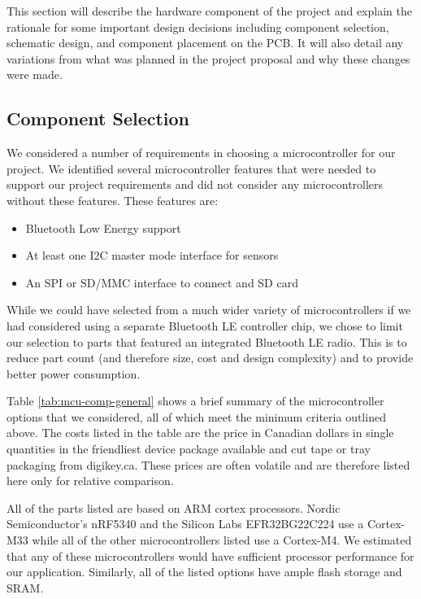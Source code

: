 This section will describe the hardware component of the project and explain 
the rationale for some important design decisions including component selection,
schematic design, and component placement on the PCB. It will also detail any 
variations from what was planned in the project proposal and why these changes
were made.

\subsection{Component Selection}

We considered a number of requirements in choosing a microcontroller for our
project. We identified several microcontroller features that were needed to
support our project requirements and did not consider any microcontrollers
without these features. These features are:
\begin{itemize}
    \item Bluetooth Low Energy support
    \item At least one I2C master mode interface for sensors
    \item An SPI or SD/MMC interface to connect and SD card
\end{itemize}

While we could have selected from a much wider variety of microcontrollers if we
had considered using a separate Bluetooth LE controller chip, we chose to limit
our selection to parts that featured an integrated Bluetooth LE radio. This is
to reduce part count (and therefore size, cost and design complexity) and to
provide better power consumption.

Table \ref{tab:mcu-comp-general} shows a brief summary of the microcontroller
options that we considered, all of which meet the minimum criteria outlined
above. The costs listed in the table are the price in Canadian dollars in single
quantities in the friendliest device package available and cut tape or tray
packaging from digikey.ca. These prices are often volatile and are therefore
listed here only for relative comparison.

All of the parts listed are based on ARM cortex processors. Nordic
Semiconductor's nRF5340 and the Silicon Labs EFR32BG22C224 use a Cortex-M33
while all of the other microcontrollers listed use a Cortex-M4. We estimated that
any of these microcontrollers would have sufficient processor performance for
our application. Similarly, all of the listed options have ample flash storage
and SRAM.

